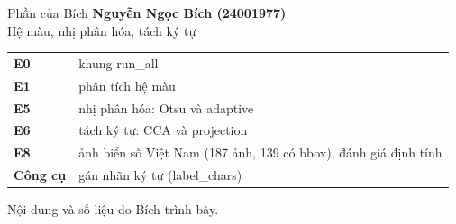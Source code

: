 \documentclass[aspectratio=169,11pt]{beamer}
\newcommand{\code}[1]{{\footnotesize\ttfamily #1}}
\newcommand{\acc}[1]{\textcolor{accent}{\textbf{#1}}}
\begin{document}
\begin{frame}{Phần của Bích}
  \centering
  \vspace{8mm}
  {\Large\bfseries\color{accentdark} Nguyễn Ngọc Bích (24001977)}\\[4mm]
  {\color{muted}Hệ màu, nhị phân hóa, tách ký tự}\\[8mm]
  \begin{tabular}{@{}ll@{}}
    \acc{E0} & khung \code{run\_all}\\
    \acc{E1} & phân tích hệ màu\\
    \acc{E5} & nhị phân hóa: Otsu và adaptive\\
    \acc{E6} & tách ký tự: CCA và projection\\
    \acc{E8} & ảnh biển số Việt Nam (187 ảnh, 139 có bbox), đánh giá định tính\\
    \acc{Công cụ} & gán nhãn ký tự (\code{label\_chars})\\
  \end{tabular}
  \vfill
  {\footnotesize\color{muted}Nội dung và số liệu do Bích trình bày.}
\end{frame}

\begin{frame}[plain]
\end{frame}
\end{document}
